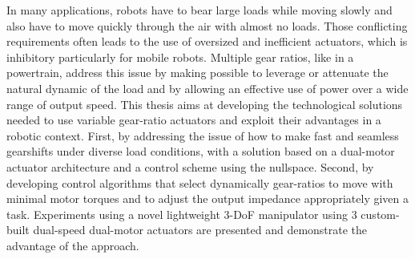 In many applications, robots have to bear large loads while moving slowly and also have to move quickly through the air with almost no loads. Those conflicting requirements often leads to the use of oversized and inefficient actuators, which is inhibitory particularly for mobile robots. Multiple gear ratios, like in a powertrain, address this issue by making possible to leverage or attenuate the natural dynamic of the load and by allowing an effective use of power over a wide range of output speed. This thesis aims at developing the technological solutions needed to use variable gear-ratio actuators and exploit their advantages in a robotic context. First, by addressing the issue of how to make fast and seamless gearshifts under diverse load conditions, with a solution based on a dual-motor actuator architecture and a control scheme using the nullspace. Second, by developing control algorithms that select dynamically gear-ratios to move with minimal motor torques and to adjust the output impedance appropriately given a task. Experiments using a novel lightweight 3-DoF manipulator using 3 custom-built dual-speed dual-motor actuators are presented and demonstrate the advantage of the approach. 


